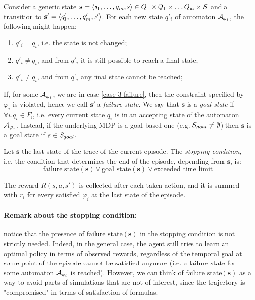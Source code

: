 Consider a generic state $\mathbf{s}=\langle q_1, \dots, q_m, s \rangle\in Q_1\times Q_1\times \dots Q_m \times S$ and a transition to $\mathbf{s'}=\langle q'_1, \dots, q'_m, s' \rangle$. For each new state $q'_i$ of automaton $\mathcal{A}_{\varphi_i}$, the following might happen:
\begin{enumerate}
	\item $q'_i = q_i$, i.e. the state is not changed;\label{case-1-nochange}
	\item $q'_i \neq q_i$, and from $q'_i$ it is still possible to reach a final state;\label{case-2-change}
	\item $q'_i \neq q_i$, and from $q'_i$ any final state cannot be reached;\label{case-3-failure}
\end{enumerate}
If, for some $\mathcal{A}_{\varphi_i}$, we are in case \ref{case-3-failure}, then the constraint specified by $\varphi_i$ is violated, hence we call $\mathbf{s'}$ a \emph{failure state}. We say that $\mathbf{s}$ is a \emph{goal state} if $\forall i. q_i \in F_i$, i.e. every current state $q_i$ is in an accepting state of the automaton $\mathcal{A}_{\varphi_i}$. Instead, if the underlying MDP is a goal-based one (e.g. $S_{goal}\neq \emptyset$) then $\mathbf{s}$ is a goal state if $s\in S_{goal}$.

Let $\mathbf{s}$ the last state of the trace of the current episode. The \emph{stopping condition}, i.e. the condition that determines the end of the episode, depending from $\mathbf{s}$, is:
$$
\mathrm{failure\_state}(\mathbf{s}) \vee \mathrm{goal\_state}(\mathbf{s}) \vee \mathrm{exceeded\_time\_limit}
$$

The reward $R(s,a,s')$ is collected after each taken action, and it is summed with $r_i$ for every satisfied $\varphi_i$ at the last state of the episode.

\paragraph{Remark about the stopping condition:} notice that the presence of $\mathrm{failure\_state}(\mathbf{s})$ in the stopping condition is not strictly needed. Indeed, in the general case, the agent still tries to learn an optimal policy in terms of observed rewards, regardless of the temporal goal at some point of the episode cannot be satisfied anymore (i.e. a failure state for some automaton $\mathcal{A}_{\varphi_i}$ is reached). However, we can think of $\mathrm{failure\_state}(\mathbf{s})$ as a way to avoid parts of simulations that are not of interest, since the trajectory is "compromised" in terms of satisfaction of \LLf formulas.

